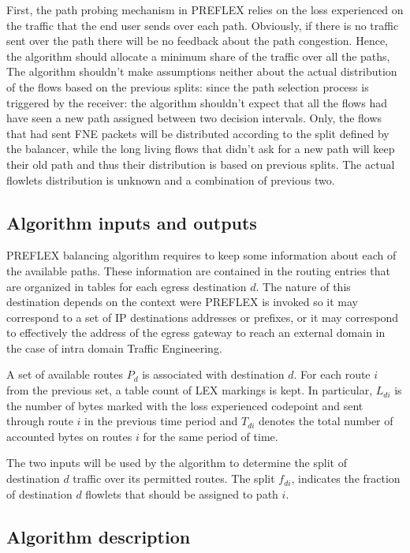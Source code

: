 First, the path probing mechanism in PREFLEX relies on the loss experienced on the traffic that the end user sends over each path. Obviously, if  there is no traffic sent over the path there will be no feedback about the path congestion. Hence, the algorithm should allocate a minimum share of the traffic over all the paths,
The algorithm shouldn't make assumptions neither about the actual distribution of the flows based on the previous splits: since the path selection process is triggered by the receiver: the algorithm shouldn't expect that all the flows had have seen a new path assigned between two decision intervals. Only, the flows that had sent FNE packets will be distributed according to the split defined by the balancer, while the long living flows that didn't ask for a new path will keep their old path and thus their distribution is based on previous splits. The actual flowlets distribution is unknown and a combination of previous two.

\subsection{Algorithm inputs and outputs}

PREFLEX balancing algorithm requires to keep some information about each of the available paths. These information are contained in the routing entries that are organized in tables for each egress destination $d$. The nature of this destination depends on the context were PREFLEX is invoked so it may correspond to a set of IP destinations addresses or prefixes, or it may correspond to effectively the  address of the egress gateway to reach an external domain in the case of intra domain Traffic Engineering. 

A set of available routes $P_{d}$ is associated with destination $d$. For each route $i$ from the previous set, a table count of LEX markings is kept. In particular, $L_{di}$ is the number of bytes marked with the loss experienced codepoint and sent through route $i$ in the previous time period and $T_{di}$ denotes the total number of accounted bytes on routes $i$ for the same period of time. 

The two inputs will be used by the algorithm to determine the split of destination $d$ traffic over its permitted routes. The split $f_{di}$, indicates  the fraction of destination $d$ flowlets  that should be assigned to path $i$. 

\subsection{Algorithm description}

